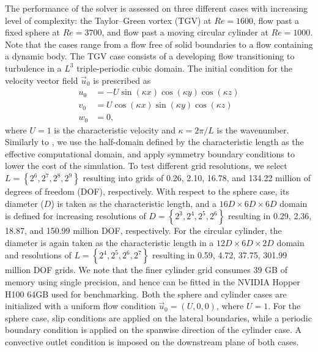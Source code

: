 \documentclass[10pt,a4paper]{article}
\begin{document}
The performance of the solver is assessed on three different cases with increasing level of complexity: the Taylor--Green vortex (TGV) at $Re=1600$, flow past a fixed sphere at $Re=3700$, and flow past a moving circular cylinder at $Re=1000$. Note that the cases range from a flow free of solid boundaries to a flow containing a dynamic body. The TGV case consists of a developing flow transitioning to turbulence in a $L^3$ triple-periodic cubic domain. The initial condition for the velocity vector field $\vec{u}_0$ is prescribed as
\begin{align}
u_0 &= -U\sin(\kappa x)\cos(\kappa y)\cos(\kappa z) \\
v_0 &= U\cos(\kappa x)\sin(\kappa y)\cos(\kappa z) \\
w_0 &= 0,
\end{align}
where $U=1$ is the characteristic velocity and $\kappa=2\pi/L$ is the wavenumber. Similarly to \cite{Dairay2017}, we use the half-domain defined by the characteristic length as the effective computational domain, and apply symmetry boundary conditions to lower the cost of the simulation. To test different grid resolutions, we select $L=\left\{2^6,2^7,2^8,2^9\right\}$ resulting into grids of 0.26, 2.10, 16.78, and 134.22 million of degrees of freedom (DOF), respectively. With respect to the sphere case, its diameter ($D$) is taken as the characteristic length, and a $16D\times6D\times6D$ domain is defined for increasing resolutions of $D=\left\{2^3,2^4,2^5,2^6\right\}$ resulting in 0.29, 2.36, 18.87, and 150.99 million DOF, respectively. For the circular cylinder, the diameter is again taken as the characteristic length in a $12D\times6D\times2D$ domain and resolutions of $L=\left\{2^4,2^5,2^6,2^7\right\}$ resulting in 0.59, 4.72, 37.75, 301.99 million DOF grids. We note that the finer cylinder grid consumes 39 GB of memory using single precision, and hence can be fitted in the NVIDIA Hopper H100 64GB used for benchmarking. Both the sphere and cylinder cases are initialized with a uniform flow condition $\vec{u}_0=(U,0,0)$, where $U=1$. For the sphere case, slip conditions are applied on the lateral boundaries, while a periodic boundary condition is applied on the spanwise direction of the cylinder case. A convective outlet condition is imposed on the downstream plane of both cases.
\end{document}
